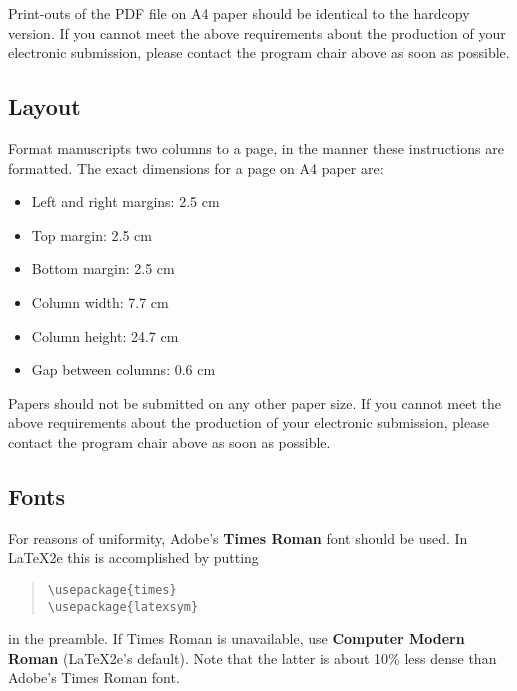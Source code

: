 \documentclass[11pt]{article}
\begin{document}

Print-outs of the PDF file on A4 paper should be identical to the
hardcopy version. If you cannot meet the above requirements about the
production of your electronic submission, please contact the
program chair above as soon as possible.


\subsection{Layout}
\label{ssec:layout}

Format manuscripts two columns to a page, in the manner these
instructions are formatted. The exact dimensions for a page on A4
paper are:

\begin{itemize}
\item Left and right margins: 2.5 cm
\item Top margin: 2.5 cm
\item Bottom margin: 2.5 cm
\item Column width: 7.7 cm
\item Column height: 24.7 cm
\item Gap between columns: 0.6 cm
\end{itemize}

\noindent Papers should not be submitted on any other paper size.
 If you cannot meet the above requirements about the production of your electronic submission, 
please contact the program chair above as soon as possible.

\subsection{Fonts}
\label{ssec:fonts}
For reasons of uniformity, Adobe's {\bf Times Roman} font should be
used. In \LaTeX2e{} this is accomplished by putting

\begin{quote}
\begin{verbatim}
\usepackage{times}
\usepackage{latexsym}
\end{verbatim}
\end{quote}
in the preamble. If Times Roman is unavailable, use {\bf Computer
  Modern Roman} (\LaTeX2e{}'s default).  Note that the latter is about
  10\% less dense than Adobe's Times Roman font.
\end{document}
